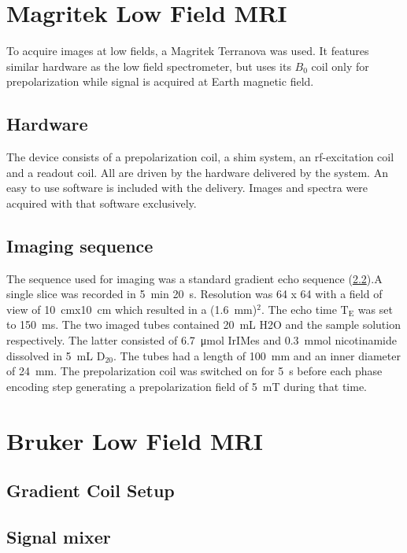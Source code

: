     \section{Magritek Low Field MRI}
            To acquire images at low fields, a Magritek Terranova  was used. It features similar hardware as the low field spectrometer, but uses its $B_0$ coil only for prepolarization while signal is acquired at Earth magnetic field.
        \subsection{Hardware}
            The device consists of a prepolarization coil, a shim system, an rf-excitation coil and a readout coil. All are driven by the hardware delivered by the system. An easy to use software is included with the delivery. Images and spectra were acquired with that software exclusively.
        \subsection{Imaging sequence}
        The sequence used for imaging was a standard gradient echo sequence (\ref{}).A single slice was recorded in \SI{5}{\minute} \SI{20}{\second}. Resolution was 64 x 64 with a field of view of \SI{10}{\cm}x\SI{10}{\cm} which resulted in a (\SI{1.6}{\mm})$^2$. The echo time $\mathrm{T_E}$ was set to \SI{150}{\milli\second}. The two imaged tubes contained \SI{20}{\milli\liter} H2O and the sample solution respectively. The latter consisted of \SI{6.7}{\micro\mole} IrIMes and \SI{0.3}{\milli\mole} nicotinamide dissolved in \SI{5}{\milli\liter} $\mathrm{D_20}$. The tubes had a length of \SI{100}{\milli\meter} and an inner diameter of \SI{24}{\milli\meter}. The prepolarization coil was switched on for \SI{5}{\second} before each phase encoding step generating a prepolarization field of \SI{5}{\milli\tesla} during that time. 
    \section{Bruker Low Field MRI}
        \subsection{Gradient Coil Setup}
        \subsection{Signal mixer}
